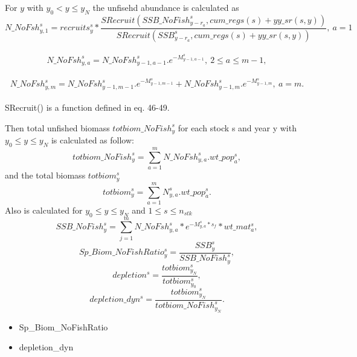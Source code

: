 \documentclass{article}
\begin{document}
For $y$ with $y_0 < y \leq y_N$ the unfisehd abundance is calculated as 
\\
\begin{equation}
    N\_NoFsh^s_{y,1}=recruits^s_y*\dfrac{SRecruit(SSB\_NoFish^s_{y-r_a},cum\_regs(s)+yy\_sr(s,y))}{SRecruit(SSB^s_{y-r_a},cum\_regs(s)+yy\_sr(s,y))}, \ a=1
\end{equation}
\\
\begin{equation}
    N\_NoFsh^s_{y,a}=N\_NoFsh^s_{y-1,a-1}.e^{-M^s_{y-1, a-1}}, \ 2\leq a \leq m-1, 
\end{equation}
\\
\begin{equation}
    N\_NoFsh^s_{y,m}=N\_NoFsh^s_{y-1,m-1}.e^{-M^s_{y-1,m-1}}+N\_NoFsh^s_{y-1,m}.e^{-M^s_{y-1,m}}, \ a=m.
\end{equation}
\\
SRecruit() is a function defined in eq. 46-49.

Then total unfished biomass $totbiom\_NoFish^s_y$  for each stock s and year y with $y_0 \leq y \leq y_N$ is calculated as follow:
\begin{equation}
    totbiom\_NoFish^s_y=\sum_{a=1}^m N\_NoFsh^s_{y,a}.wt\_pop^s_a,
\end{equation}
and the total biomass $totbiom^s_y$ 
\begin{equation}
    totbiom^s_y=\sum_{a=1}^m N^s_{y,a}.wt\_pop^s_a.
\end{equation}
Also is calculated for $y_0 \leq y \leq y_N$ and $1\leq s \leq n_{stk}$
\begin{equation}
SSB\_NoFish^s_y=\sum_{j=1}^m N\_NoFsh^s_{y,a}*e^{-M^s_{y,a}*s_f}*wt\_mat^s_a,
\end{equation}
\begin{equation}
    Sp\_Biom\_NoFishRatio^s_y=\dfrac{SSB^s_y}{SSB\_NoFish^s_y},
\end{equation}
\begin{equation}
    depletion^s=\dfrac{totbiom^s_{y_N}}{totbiom^s_{y_0}},
\end{equation}
\begin{equation}
    depletion\_dyn^s=\dfrac{totbiom^s_{y_N}}{totbiom\_NoFish^s_{y_N}}.
\end{equation}
\begin{itemize}
    \item Sp\_Biom\_NoFishRatio
    \item depletion\_dyn
\end{itemize}
\end{document}
